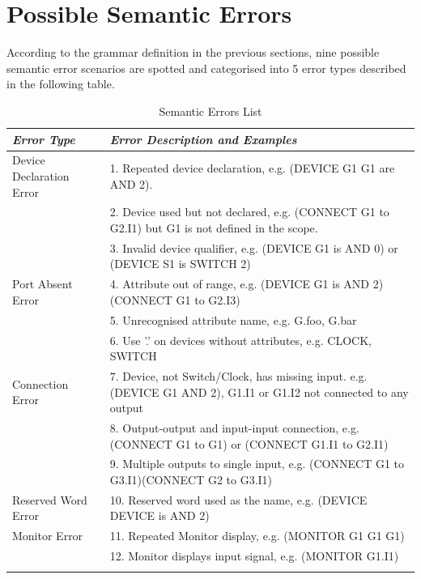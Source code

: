 \documentclass[12pt]{article}
\def\n{\noindent}
\begin{document}
\section{Possible Semantic Errors}
\n According to the grammar definition in the previous sections, nine possible semantic error scenarios are spotted and categorised into 5 error types described in the following table.
\begin{table}[H]
\centering
\begin{longtable}{p{5cm}p{10cm}}
\textit{Error Type} & {\textit{Error Description and Examples}}\\
\toprule
\addlinespace[0.2cm]
Device Declaration Error & 1. Repeated device declaration, \newline e.g. (DEVICE G1 G1 are AND 2). \\
\addlinespace[0.2cm]
& 2. Device used but not declared, \newline e.g. (CONNECT G1 to G2.I1) but G1 is not defined in the scope.\\
\addlinespace[0.2cm]
& 3. Invalid device qualifier, \newline e.g. (DEVICE G1 is AND 0) or (DEVICE S1 is SWITCH 2)\\
\addlinespace[0.2cm]
\midrule
Port Absent Error & 4. Attribute out of range, \newline e.g. (DEVICE G1 is AND 2)(CONNECT G1 to G2.I3)\\
\addlinespace[0.2cm]
& 5. Unrecognised attribute name, \newline e.g. G.foo, G.bar\\
\addlinespace[0.2cm]
& 6. Use '.' on devices without attributes, \newline e.g. CLOCK, SWITCH\\
\addlinespace[0.2cm]
\midrule
  Connection Error & 7. Device, not Switch/Clock, has missing input.\newline
  e.g. (DEVICE G1 AND 2), G1.I1 or G1.I2 not connected to any output\\
& 8. Output-output and input-input connection, \newline e.g. (CONNECT G1 to G1) or (CONNECT G1.I1 to G2.I1)\\
& 9. Multiple outputs to single input, \newline e.g. (CONNECT G1 to G3.I1)(CONNECT G2 to G3.I1)\\
\addlinespace[0.2cm]
\midrule
Reserved Word Error & 10. Reserved word used as the name, \newline e.g. (DEVICE DEVICE is AND 2)\\
\addlinespace[0.2cm]
\midrule
Monitor Error & 11. Repeated Monitor display, \newline e.g. (MONITOR G1 G1 G1)\\
\addlinespace[0.2cm]
& 12. Monitor displays input signal, \newline e.g. (MONITOR G1.I1)\\
\addlinespace[0.2cm]
\end{longtable}
\caption{Semantic Errors List}
\end{table}
\end{document}
